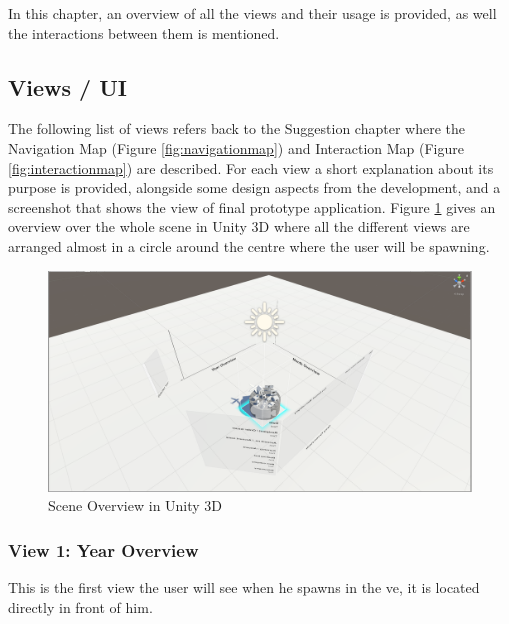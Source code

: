 In this chapter, an overview of all the views and their usage is provided, as well the interactions between them is mentioned.

\subsection{Views / UI}

The following list of views refers back to the Suggestion chapter where the Navigation Map (Figure \ref{fig:navigationmap}) and Interaction Map (Figure \ref{fig:interactionmap}) are described. For each view a short explanation about its purpose is provided, alongside some design aspects from the development, and a screenshot that shows the view of final prototype application. Figure \ref{fig:unityoverview} gives an overview over the whole scene in Unity 3D where all the different views are arranged almost in a circle around the centre where the user will be spawning.

\begin{figure}[h]
	\begin{center}
		\includegraphics[width=14cm]{03_Figures/08_Development/Unity_Overview.png}
		\caption{Scene Overview in Unity 3D}
		\label{fig:unityoverview}
	\end{center}
\end{figure}

\subsubsection{View 1: Year Overview}

This is the first view the user will see when he spawns in the \gls{ve}, it is located directly in front of him.


